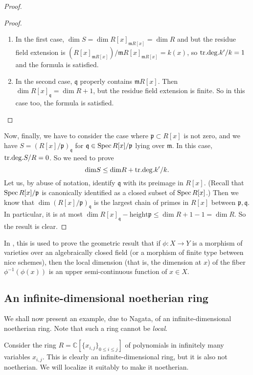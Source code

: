 \begin{proof}
\begin{proof}
\begin{enumerate}
\item 
In the first case, $\dim S = \dim R[x]_{\mathfrak{m}R[x]} = \dim R$ and but the
residue field extension is $(R[x]_{\mathfrak{m}R[x]})/\mathfrak{m}
R[x]_{\mathfrak{m}R[x]} = k(x)$, so $\mathrm{tr.deg.} k'/k = 1$ and the formula is
satisfied. 
\item  In the second case, $\mathfrak{q}$ properly contains $\mathfrak{m}
R[x]$.
Then $\dim R[x]_{\mathfrak{q}} = \dim R + 1$, but the residue field extension
is finite. So in this case too, the formula is satisfied.
\end{enumerate}
\end{proof}


Now, finally, we have to consider the case where $\mathfrak{p} \subset R[x]$ is
not zero, and we have $S = (R[x]/\mathfrak{p})_{\mathfrak{q}}$ for
$\mathfrak{q} \in \operatorname{Spec} R[x]/\mathfrak{p}$ lying over $\mathfrak{m}$.
In this case, $\mathrm{tr.deg.} S/R = 0$. So we need to prove
\[ \mathrm{dim} S \leq \mathrm{dim} R + \mathrm{tr.deg.} k'/k.  \]
Let us, by abuse of notation, identify $\mathfrak{q}$ with its preimage in
$R[x]$.
(Recall that $\operatorname{Spec} R[x]/\mathfrak{p}$ is canonically identified as a closed
subset of $\operatorname{Spec} R[x]$.)
Then we know that
\( \dim ( R[x]/\mathfrak{p})_{\mathfrak{q}}  \)
is the largest chain of primes in $R[x]$ between $\mathfrak{p}, \mathfrak{q}$.
In particular, it is at most $\dim R[x]_{\mathfrak{q}} - \mathrm{height}
\mathfrak{p}
\leq \dim R + 1 - 1 = \dim R$. So the result is clear.
\end{proof} 

In \cite{EGA}, this is used to prove the geometric result that if $\phi:X  \to
Y$ is a morphism of varieties over an algebraically closed field (or a morphism
of finite type between nice schemes), then the local dimension (that is, the
dimension at $x$) of
the fiber $\phi^{-1}(\phi(x))$ is an upper semi-continuous function of $x \in X$.
\subsection{An infinite-dimensional noetherian ring}

We shall now present an example, due to Nagata, of an infinite-dimensional
noetherian ring. Note that such a ring cannot be \emph{local}.

Consider the ring $R=\mathbb{C}[\{x_{i,j}\}_{0 \leq i \leq j}]$ of polynomials in 
infinitely many variables $x_{i,j}$. 
This is clearly an infinite-dimensional ring, but it is also not noetherian.
We will localize it suitably to make it noetherian.

